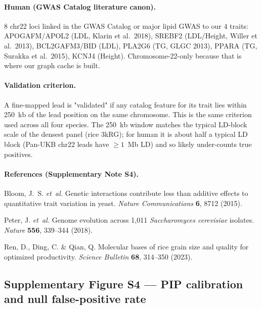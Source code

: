 \paragraph{Human (GWAS Catalog literature canon).}
8 chr22 loci linked in the GWAS Catalog or major lipid GWAS
to our 4 traits: APOGAFM/APOL2 (LDL, Klarin et al.\ 2018),
SREBF2 (LDL/Height, Willer et al.\ 2013), BCL2GAFM3/BID (LDL),
PLA2G6 (TG, GLGC 2013), PPARA (TG, Surakka et al.\ 2015),
KCNJ4 (Height). Chromosome-22-only because that is
where our graph cache is built.

\paragraph{Validation criterion.} A fine-mapped lead is "validated"
if any catalog feature for its trait lies within 250~kb of the lead
position on the same chromosome. This is the same criterion used
across all four species. The 250~kb window matches the typical
LD-block scale of the densest panel (rice 3kRG); for human it is
about half a typical LD block (Pan-UKB chr22 leads have $\geq 1$~Mb
LD) and so likely under-counts true positives.

\paragraph{References (Supplementary Note S4).}
\begin{enumerate}[leftmargin=2.2em,itemsep=0.2em,topsep=0.2em,label={[\arabic*]}]
\item Bloom, J.~S. \emph{et~al.} Genetic interactions contribute
less than additive effects to quantitative trait variation in
yeast. \textit{Nature Communications} \textbf{6}, 8712 (2015).
\item Peter, J. \emph{et~al.} Genome evolution across 1{,}011
\textit{Saccharomyces cerevisiae} isolates. \textit{Nature}
\textbf{556}, 339--344 (2018).
\item Ren, D., Ding, C. \& Qian, Q. Molecular bases of rice grain
size and quality for optimized productivity. \textit{Science
Bulletin} \textbf{68}, 314--350 (2023).
\end{enumerate}

\clearpage

\subsection*{Supplementary Figure S4 --- PIP calibration and null false-positive rate}

